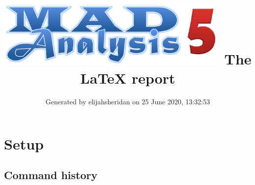 \documentclass[a4paper, 10pt]{article}
\title{{\includegraphics[scale=.4]{logo.png}}\ The LaTeX report}
\author{Generated by elijahsheridan on 25 June 2020, 13:32:53}
\begin{document}
\maketitle
\flushbottom

\newpage
\section{ Setup}

\subsection{ Command history}
\end{document}

